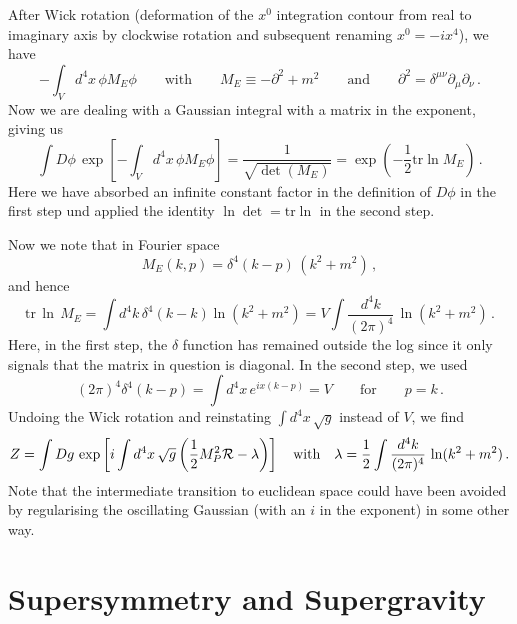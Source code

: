 \documentclass[12pt]{article}
\newcommand{\be}{\begin{equation}}
\newcommand{\ee}{\end{equation}}
\numberwithin{equation}{section}
\begin{document}
After Wick rotation (deformation of the $x^0$ integration contour from real to imaginary axis by clockwise rotation and subsequent renaming $x^0=-ix^4$), we have
\be
-\int_V d^4x\,\phi M_E \phi\qquad\mbox{with}\qquad M_E\equiv -\partial^2 +m^2 \qquad \mbox{and} \qquad \partial^2=\delta^{\mu\nu} \partial_\mu\partial_\nu\,.
\ee
Now we are dealing with a Gaussian integral with a matrix in the exponent, giving us
\be
\int D\phi\,\exp\left[-\int_V d^4x\,\phi M_E \phi\right]= \frac{1}{\sqrt{\det(M_E)}}=\exp\left(-\frac{1}{2}\mbox{tr}\ln M_E \right)\,.
\ee
Here we have absorbed an infinite constant factor in the definition of $D\phi$ in the first step und applied the identity $\ln\det=\mbox{tr}\ln$ in the second step. 

Now we note that in Fourier space
\be
M_E(k,p)=\delta^4(k-p)\,(k^2+m^2)\,,
\ee
and hence
\be
\mbox{tr}\,\ln\,M_E=\int d^4k\,\delta^4(k-k)\ln(k^2+m^2)=V\int\frac{d^4k}{(2\pi)^4}\,\ln(k^2+m^2)\,.
\ee
Here, in the first step, the $\delta$ function has remained outside the log since it only signals that the matrix in question is diagonal. In the second step, we used
\be
(2\pi)^4\delta^4(k-p)=\int d^4x\,e^{ix(k-p)}=V\qquad\mbox{for}\qquad p=k\,.
\ee
Undoing the Wick rotation and reinstating $\int d^4x\,\sqrt{g}$ instead of $V$, we find 
\be
Z=\int Dg\,\exp\left[i\int d^4x\,\sqrt{g}\left(\frac{1}{2}M_P^2{\cal R}- \lambda\right)\right]\quad\mbox{with}\quad \lambda=\frac{1}{2}\int \frac{d^4k}{(2\pi)^4}\,\ln(k^2+m^2)\,.
\ee
Note that the intermediate transition to euclidean space could have been avoided by regularising the oscillating Gaussian (with an $i$ in the exponent) in some other way.






\section{Supersymmetry and Supergravity}\label{sands}
\end{document}
